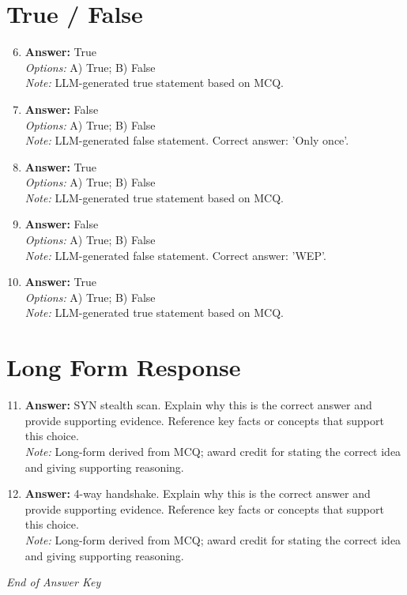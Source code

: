 \documentclass[12pt]{article}
\begin{document}
\section*{True / False}
\begin{enumerate}[label=\arabic*.]
\setcounter{enumi}{5}
\item \textbf{Answer:} True
\\ \textit{Options:} A) True; B) False
\\ \textit{Note:} LLM-generated true statement based on MCQ.
\item \textbf{Answer:} False
\\ \textit{Options:} A) True; B) False
\\ \textit{Note:} LLM-generated false statement. Correct answer: 'Only once'.
\item \textbf{Answer:} True
\\ \textit{Options:} A) True; B) False
\\ \textit{Note:} LLM-generated true statement based on MCQ.
\item \textbf{Answer:} False
\\ \textit{Options:} A) True; B) False
\\ \textit{Note:} LLM-generated false statement. Correct answer: 'WEP'.
\item \textbf{Answer:} True
\\ \textit{Options:} A) True; B) False
\\ \textit{Note:} LLM-generated true statement based on MCQ.
\end{enumerate}

\section*{Long Form Response}
\begin{enumerate}[label=\arabic*.]
\setcounter{enumi}{10}
\item \textbf{Answer:} SYN stealth scan. Explain why this is the correct answer and provide supporting evidence. Reference key facts or concepts that support this choice.
\\ \textit{Note:} Long-form derived from MCQ; award credit for stating the correct idea and giving supporting reasoning.
\item \textbf{Answer:} 4-way handshake. Explain why this is the correct answer and provide supporting evidence. Reference key facts or concepts that support this choice.
\\ \textit{Note:} Long-form derived from MCQ; award credit for stating the correct idea and giving supporting reasoning.
\end{enumerate}

\vfill
\noindent\textit{End of Answer Key}
\end{document}
